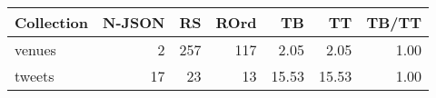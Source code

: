 \begin{tabular}{lrrrrrr} 
\toprule 
Collection & N-JSON & RS & ROrd & TB & TT  & TB/TT \\ 
\midrule 
venues & 2 & 257 & 117 & 2.05 & 2.05 & 1.00 \\ 
tweets & 17 & 23 & 13 & 15.53 & 15.53 & 1.00 \\ 
\bottomrule 
\end{tabular} 